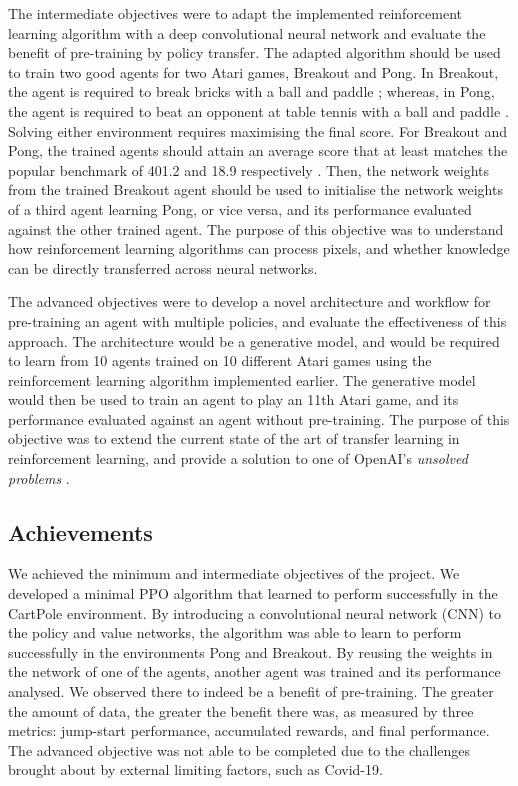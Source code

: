 \documentclass[12pt,a4paper]{article}
\begin{document}
The intermediate objectives were to adapt the implemented reinforcement learning algorithm with a deep convolutional neural network and evaluate the benefit of pre-training by policy transfer. The adapted algorithm should be used to train two good agents for two Atari games, Breakout and Pong. In Breakout, the agent is required to break bricks with a ball and paddle \cite{}; whereas, in Pong, the agent is required to beat an opponent at table tennis with a ball and paddle \cite{}. Solving either environment requires maximising the final score. For Breakout and Pong, the trained agents should attain an average score that at least matches the popular benchmark of 401.2 and 18.9 respectively \cite{}. Then, the network weights from the trained Breakout agent should be used to initialise the network weights of a third agent learning Pong, or vice versa, and its performance evaluated against the other trained agent. The purpose of this objective was to understand how reinforcement learning algorithms can process pixels, and whether knowledge can be directly transferred across neural networks.

The advanced objectives were to develop a novel architecture and workflow for pre-training an agent with multiple policies, and evaluate the effectiveness of this approach. The architecture would be a generative model, and would be required to learn from 10 agents trained on 10 different Atari games using the reinforcement learning algorithm implemented earlier. The generative model would then be used to train an agent to play an 11th Atari game, and its performance evaluated against an agent without pre-training. The purpose of this objective was to extend the current state of the art of transfer learning in reinforcement learning, and provide a solution to one of OpenAI's \textit{unsolved problems} \cite{}.

\subsection{Achievements}
We achieved the minimum and intermediate objectives of the project. We developed a minimal PPO algorithm that learned to perform successfully in the CartPole environment. By introducing a convolutional neural network (CNN) to the policy and value networks, the algorithm was able to learn to perform successfully in the environments Pong and Breakout. By reusing the weights in the network of one of the agents, another agent was trained and its performance analysed. We observed there to indeed be a benefit of pre-training. The greater the amount of data, the greater the benefit there was, as measured by three metrics: jump-start performance, accumulated rewards, and final performance. The advanced objective was not able to be completed due to the challenges brought about by external limiting factors, such as Covid-19. 
\end{document}
